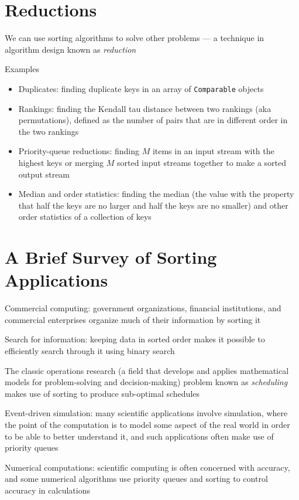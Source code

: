 \documentclass[8pt,a4paper,compress]{beamer}
\begin{document}
\section{Reductions}
\begin{frame}[fragile]
We can use sorting algorithms to solve other problems --- a technique in algorithm design known as \emph{reduction} 

\bigskip

Examples
\begin{itemize}
\item Duplicates: finding duplicate keys in an array of \lstinline$Comparable$ objects
\item Rankings: finding the Kendall tau distance between two rankings (aka permutations), defined as the number of pairs that are in different order in the two rankings
\item Priority-queue reductions: finding $M$ items in an input stream with the highest keys or merging $M$ sorted input streams together to make a sorted output stream
\item Median and order statistics: finding the median (the value with the property that half the keys are no larger and half the keys are no smaller) and other order statistics of a collection of keys
\end{itemize}
\end{frame}

\section{A Brief Survey of Sorting Applications}
\begin{frame}[fragile]
Commercial computing: government organizations, financial institutions, and commercial enterprises organize much of their information by sorting it

\bigskip

Search for information: keeping data in sorted order makes it possible to efficiently search through it using binary search

\bigskip

The classic operations research (a field that develops and applies mathematical models for problem-solving and decision-making) problem known as \emph{scheduling} makes use of sorting to produce sub-optimal schedules

\bigskip

Event-driven simulation: many scientific applications involve simulation, where the point of the computation is to model some aspect of the real world in order to be able to better understand it, and such applications often make use of priority queues

\bigskip

Numerical computations: scientific computing is often concerned with accuracy, and some numerical algorithms use priority queues and sorting to control accuracy in calculations
\end{frame}
\end{document}
